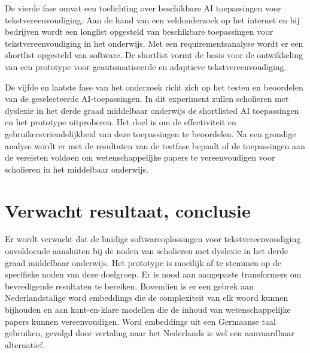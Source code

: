 De vierde fase omvat een toelichting over beschikbare AI toepassingen voor tekstvereenvoudiging. Aan de hand van een veldonderzoek op het internet en bij bedrijven wordt een longlist opgesteld van beschikbare toepassingen voor tekstvereenvoudiging in het onderwijs. Met een requirementsanalyse wordt er een shortlist opgesteld van software. De shortlist vormt de basis voor de ontwikkeling van een prototype voor geautomatiseerde en adaptieve tekstvereenvoudiging.

De vijfde en laatste fase van het onderzoek richt zich op het testen en beoordelen van de geselecteerde AI-toepassingen. In dit experiment zullen scholieren met dyslexie in het derde graad middelbaar onderwijs de shortlisted AI toepassingen en het prototype uitproberen. Het doel is om de effectiviteit en gebruikersvriendelijkheid van deze toepassingen te beoordelen. Na een grondige analyse wordt er met de resultaten van de testfase bepaalt of de toepassingen aan de vereisten voldoen om wetenschappelijke papers te vereenvoudigen voor scholieren in het middelbaar onderwijs.

\section{Verwacht resultaat, conclusie}
\label{sec:verwachte_resultaten}


Er wordt verwacht dat de huidige softwareoplossingen voor tekstvereenvoudiging onvoldoende aansluiten bij de noden van scholieren met dyslexie in het derde graad middelbaar onderwijs. Het prototype is moeilijk af te stemmen op de specifieke noden van deze doelgroep. Er is nood aan aangepaste transformers om bevredigende resultaten te bereiken. Bovendien is er een gebrek aan Nederlandstalige word embeddings die de complexiteit van elk woord kunnen bijhouden en aan kant-en-klare modellen die de inhoud van wetenschappelijke papers kunnen vereenvoudigen. Word embeddings uit een Germaanse taal gebruiken, gevolgd door vertaling naar het Nederlands is wel een aanvaardbaar alternatief. 


